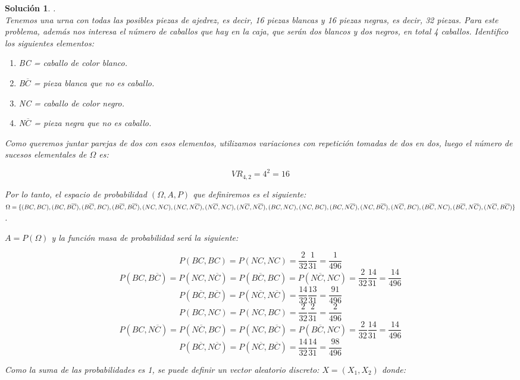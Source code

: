 \documentclass[11pt, a4paper]{article}
\newif\IfInSansMode
\newcommand{\W}{\Omega}
\theoremstyle{theorem-style}
\theoremstyle{definition-style}
\theoremstyle{remark-style}
\newtheorem*{sol}{Solución}
\theoremstyle{example-style}
\begin{document}
\begin{sol}.
\\ Tenemos una urna con todas las posibles piezas de ajedrez, es decir, 16 piezas blancas y 16 piezas negras, es decir, 32 piezas. Para este problema, además nos interesa el número de caballos que hay en la caja, que serán dos blancos y dos negros, en total 4 caballos. Identifico los siguientes elementos:

\begin{enumerate}
\item BC = caballo de color blanco.
\item B$\overline{C}$ = pieza blanca que no es caballo.
\item NC = caballo de color negro.
\item N$\overline{C}$ = pieza negra que no es caballo.
\end{enumerate}

Como queremos juntar parejas de dos con esos elementos, utilizamos variaciones con repetición tomadas de dos en dos, luego el número de sucesos elementales de $\W$ es:

$$VR_{4,2} = 4^2 = 16$$

Por lo tanto, el espacio de probabilidad $(\Omega,A,P)$ que definiremos es el siguiente: \\
$\Omega = \{(BC,BC),(BC,B\overline{C}),(B\overline{C},BC),(B\overline{C},B\overline{C}),(NC,NC),(NC,N\overline{C}),(N\overline{C},NC),(N\overline{C},N\overline{C}),(BC,NC),(NC,BC),\\ (BC,N\overline{C}),(NC,B\overline{C}),(N\overline{C},BC),(B\overline{C},NC),(B\overline{C},N\overline{C}),(N\overline{C},B\overline{C})\}$ .

$A = P(\Omega)$ y la función masa de probabilidad será la siguiente: 

$$P(BC,BC) = P(NC,NC) = \frac{2}{32}\frac{1}{31} = \frac{1}{496}$$
$$P(BC,B\overline{C}) = P(NC,N\overline{C}) = P(B\overline{C},BC) = P(N\overline{C},NC) = \frac{2}{32}\frac{14}{31} = \frac{14}{496}$$
$$P(B\overline{C},B\overline{C}) = P(N\overline{C},N\overline{C}) = \frac{14}{32}\frac{13}{31} = \frac{91}{496}$$
$$P(BC,NC) = P(NC,BC) = \frac{2}{32}\frac{2}{31} = \frac{2}{496}$$
$$P(BC,N\overline{C}) = P(N\overline{C},BC) = P(NC,B\overline{C}) = P(B\overline{C},NC) = \frac{2}{32}\frac{14}{31} = \frac{14}{496}$$
$$P(B\overline{C},N\overline{C}) = P(N\overline{C},B\overline{C}) = \frac{14}{32}\frac{14}{31} = \frac{98}{496}$$

Como la suma de las probabilidades es 1, se puede definir un vector aleatorio discreto: $X = (X_1,X_2)$ donde:


\end{sol}
\end{document}
